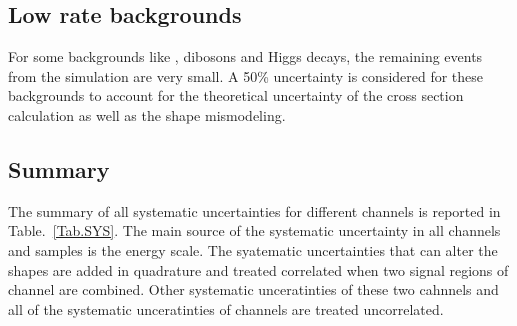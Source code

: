 \subsection{Low rate backgrounds} For some backgrounds like \ttbar, dibosons and Higgs decays, the remaining 
events from the simulation are very small. A 50\% uncertainty is considered for these backgrounds to account for the theoretical uncertainty of the
cross section calculation as well as the shape mismodeling.

\subsection{Summary}
The summary of all systematic uncertainties for different channels is reported in Table.~\ref{Tab.SYS}. The main source of the systematic uncertainty in all channels and samples is the \hadtau energy scale.  
The syatematic uncertainties that can alter the shapes are added in quadrature and 
treated correlated when two signal regions of \tauTau channel are combined. Other systematic unceratinties of these two 
cahnnels and all of the systematic unceratinties of \leptonTau channels are treated uncorrelated.



